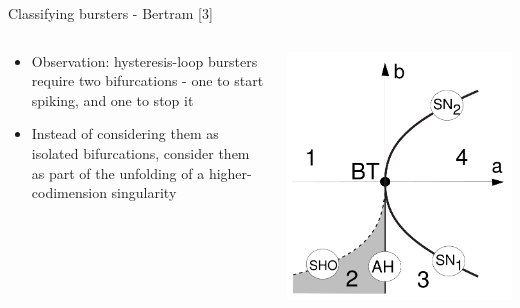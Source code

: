 \documentclass{beamer}
\begin{document}
\begin{frame}[label={sec:orgbb2ac1e}]{Classifying bursters - Bertram [3]}
\begin{columns}
\begin{column}{0.5\columnwidth}
\begin{itemize}
\item Observation: hysteresis-loop bursters require two bifurcations - one to start spiking, and one to stop it
\item Instead of considering them as isolated bifurcations, consider them as part of the unfolding of a higher-codimension singularity
\end{itemize}
\end{column}

\begin{column}{0.5\columnwidth}
\begin{center}
\includegraphics[height=0.8\textheight]{bog.png}
\end{center}
\end{column}
\end{columns}
\end{frame}
\end{document}
